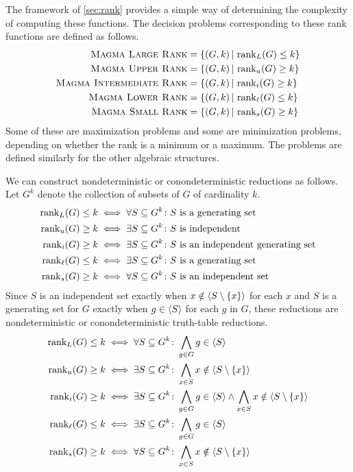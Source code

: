 The framework of \autoref{sec:rank} provides a simple way of determining the complexity of computing these functions.
The decision problems corresponding to these rank functions are defined as follows.
\begin{align*}
  \textsc{Magma Large Rank} & = \{ (G, k) \, | \, \operatorname{rank}_L(G) \leq k \} \\
  \textsc{Magma Upper Rank} & = \{ (G, k) \, | \, \operatorname{rank}_u(G) \geq k \} \\
  \textsc{Magma Intermediate Rank} & = \{ (G, k) \, | \, \operatorname{rank}_i(G) \geq k \} \\
  \textsc{Magma Lower Rank} & = \{ (G, k) \, | \, \operatorname{rank}_\ell(G) \leq k \} \\
  \textsc{Magma Small Rank} & = \{ (G, k) \, | \, \operatorname{rank}_s(G) \geq k \}
\end{align*}
Some of these are maximization problems and some are minimization problems, depending on whether the rank is a minimum or a maximum.
The problems are defined similarly for the other algebraic structures.

We can construct nondeterministic or conondeterministic reductions as follows.
Let $G^k$ denote the collection of subsets of $G$ of cardinality $k$.
\begin{align*}
  \operatorname{rank}_L(G) \leq k & \iff \forall S \subseteq G^k\colon S \text{ is a generating set} \\
  \operatorname{rank}_u(G) \geq k & \iff \exists S \subseteq G^k\colon S \text{ is independent} \\
  \operatorname{rank}_i(G) \geq k & \iff \exists S \subseteq G^k\colon S \text{ is an independent generating set} \\
  \operatorname{rank}_\ell(G) \leq k & \iff \exists S \subseteq G^k\colon S \text{ is a generating set} \\
  \operatorname{rank}_s(G) \geq k & \iff \forall S \subseteq G^k\colon S \text{ is an independent set}
\end{align*}
Since $S$ is an independent set exactly when $x \notin \langle S \setminus \{x\} \rangle$ for each $x$ and $S$ is a generating set for $G$ exactly when $g \in \langle S \rangle$ for each $g$ in $G$, these reductions are nondeterministic or conondeterministic truth-table reductions.
\begin{align*}
  \operatorname{rank}_L(G) \leq k & \iff \forall S \subseteq G^k\colon \bigwedge_{g \in G} g \in \langle S \rangle \\
  \operatorname{rank}_u(G) \geq k & \iff \exists S \subseteq G^k\colon \bigwedge_{x \in S} x \notin \langle S \setminus \{x\} \rangle \\
  \operatorname{rank}_i(G) \geq k & \iff \exists S \subseteq G^k\colon \bigwedge_{g \in G} g \in \langle S \rangle \land \bigwedge_{x \in S} x \notin \langle S \setminus \{x\} \rangle \\
  \operatorname{rank}_\ell(G) \leq k & \iff \exists S \subseteq G^k\colon \bigwedge_{g \in G} g \in \langle S \rangle \\
  \operatorname{rank}_s(G) \geq k & \iff \forall S \subseteq G^k\colon \bigwedge_{x \in S} x \notin \langle S \setminus \{x\} \rangle
\end{align*}

